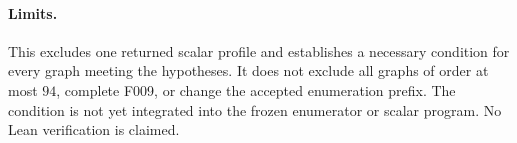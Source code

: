 \documentclass[11pt]{article}
\begin{document}
\paragraph{Limits.}
This excludes one returned scalar profile and establishes a necessary
condition for every graph meeting the hypotheses. It does not exclude all
graphs of order at most $94$, complete F009, or change the accepted
enumeration prefix. The condition is not yet integrated into the frozen
enumerator or scalar program. No Lean verification is claimed.
\end{document}
